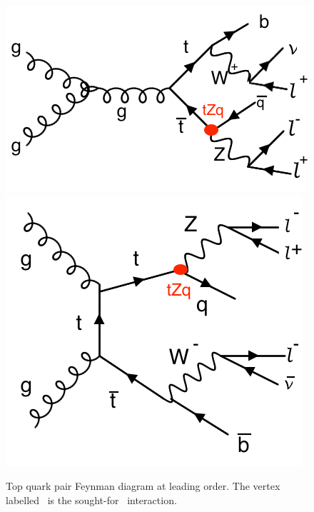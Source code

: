 \begin{figure}[htbp]
	\centering
	\includegraphics[width=0.45\linewidth]{5_EventSelection/Figures/FeynmantttZq}
	\includegraphics[width=0.35\linewidth]{5_EventSelection/Figures/FeynmantttZq2}
	\caption{Top quark pair Feynman diagram at leading order. The vertex labelled \tZq\ is the sought-for \FCNC\ interaction. }
	\label{fig:feynTT}
\end{figure}
  


